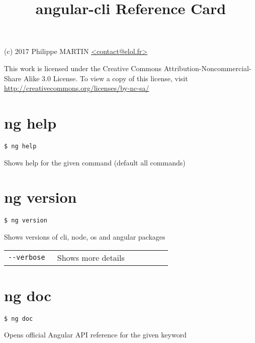 \documentclass[8pt]{extarticle} %
\begin{document}
\raggedright

\begin{multicols}{3}

\title{angular-cli Reference Card}

{\small
(c) 2017 Philippe MARTIN \url{<contact@elol.fr>}

This work is licensed under the Creative Commons Attribution-Noncommercial-Share
Alike 3.0 License. To view a copy of this license, visit
\url{http://creativecommons.org/licenses/by-nc-sa/}
}

\vspace*{1pt}

\section*{ng help}
  \vspace{1ex}
  {\tt \$ ng help }

  \vspace{0.6ex}

  {\small Shows help for the given command (default all commands)}

\section*{ng version}

  \vspace{1ex}
  {\tt \$ ng version \itt{[options...]}}

  \vspace{0.6ex}

  {\small Shows versions of cli, node, os and angular packages}

  \vspace{0.6ex}

  \begin{tabular}{L{0.30\linewidth} L{0.70\linewidth}}
    \tt -{}-verbose & \small Shows more details
  \end{tabular}

\section*{ng doc}

  \vspace{1ex}
  {\tt \$ ng doc }

  \vspace{0.6ex}

  {\small Opens official Angular API reference for the given keyword}


\end{multicols}
\end{document}
